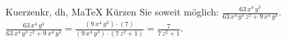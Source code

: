 \begin{MAufgabe}{Kuerzen}{kr, dh, MaTeX}
K\"urzen Sie soweit m\"oglich: $\frac{63\, x^4\, y^3}{63\, x^4\, y^3\, z^2 + 9\, x^4\, y^3}$.\\ 
\ifLsg\MLoesung
\quad $\frac{63\, x^4\, y^3}{63\, x^4\, y^3\, z^2 + 9\, x^4\, y^3}=\frac{(9\, x^4\, y^3)\cdot(7)}{(9\, x^4\, y^3)\cdot(7\, z^2 + 1)}=\frac{7}{7\, z^2 + 1}$.\else\relax\fi
 \end{MAufgabe}